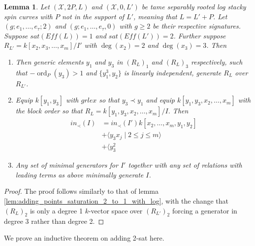 \documentclass{amsart}
\theoremstyle{plain}
\newtheorem{lem}[thm]{Lemma}
\theoremstyle{definition}
\theoremstyle{remark}
\numberwithin{equation}{section}
\newcommand \sx{\mathscr X}
\DeclareMathOperator{\ord}{ord}
\newcommand \halfcan{L}
\begin{document}
\begin{lem}
\label{lem:adding_points_saturation_2_to_1_no_log}
Let $(\sx, 2P, \halfcan)$ and $(\sx, 0, L')$ be tame separably rooted log stacky spin curves 
with $P$ not in the support of $\halfcan'$, meaning that $L=L'+P$.  Let $(g; e_1, \ldots, e_
\tau; 2)$ and $(g; e_1, \ldots, e_\tau, 0)$ with $g\ge 2$ be their respective signatures.  
Suppose $sat(Eff(\halfcan))=1$ and $sat(Eff(\halfcan'))=2$.  Further suppose 
$R_{\halfcan'} = k[x_2, x_3, \ldots, x_m]/I'$ with $\deg(x_2) = 2$ and $\deg(x_3) = 3$.  
Then
\begin{enumerate}
\item[(a)] Then generic elements $y_1$ and $y_3$ in $(R_{\halfcan})_1$ and $
(R_{\halfcan})_3$ respectively, such that $-\ord_P(y_3)>1$ and $\{y_1^3, y_2\}$ is linearly 
independent, generate $R_\halfcan$ over $R_{\halfcan'}$.
\item[(b)] Equip $k[y_1,y_3]$ with $grlex$ so that $y_3 \prec y_1$ and equip $k[y_1, y_3, 
x_2, \ldots, x_m]$ with the block order so that $R_\halfcan=k[y_1, y_3, x_2, \ldots, x_m]/I$.  
Then
\begin{align*}
			in_\prec(I) &= in_\prec(I')k[x_2, \ldots, x_m, y_1, y_2] \\
			&+\langle y_3 x_j \mid 2 \leq j \leq m \rangle \\
			&+\langle y_3^2
		\end{align*}
\item[(c)] Any set of minimal generators for $I'$ together with any set of relations with 
leading terms as above minimally generate $I$.
\end{enumerate}
\end{lem}
\begin{proof}
The proof follows similarly to that of lemma 
\ref{lem:adding_points_saturation_2_to_1_with_log}, with the change that $(R_
\halfcan)_2$ is only a degree 1 $k$-vector space over $(R_{\halfcan'})_2$ forcing a 
generator in degree 3 rather than degree 2.  
\end{proof}

We prove an inductive theorem on adding 2-sat here.
\end{document}
